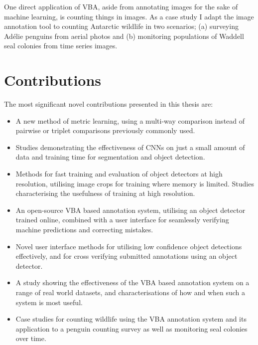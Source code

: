 One direct application of \gls{VBA}, aside from annotating images for the sake of machine learning, is counting things in images. As a case study I adapt the image annotation tool to counting Antarctic wildlife in two scenarios; (a) surveying Ad\'elie penguins from aerial photos and (b) monitoring populations of Waddell seal colonies from time series images.

\section {Contributions}
\label{sec: contributions}

The most significant novel contributions presented in this thesis are:

\begin{itemize}

    \item A new method of metric learning, using a multi-way comparison instead of pairwise or triplet comparisons previously commonly used.
    
    \item Studies demonstrating the effectiveness of \gls{CNN}s on just a small amount of data and training time for segmentation and object detection.
    
    \item Methods for fast training and evaluation of object detectors at high resolution, utilising image crops for training where memory is limited. Studies characterising the usefulness of training at high resolution.    
    
    \item An open-source \gls{VBA} based annotation system, utilising an object detector trained online, combined with a user interface for seamlessly verifying machine predictions and correcting mistakes.

    \item Novel user interface methods for utilising low confidence object detections effectively, and for cross verifying submitted annotations using an object detector.
    
    \item A study showing the effectiveness of the \gls{VBA} based annotation system on a range of real world datasets, and characterisations of how and when such a system is most useful.
    
    \item Case studies for counting wildlife using the \gls{VBA} annotation system and its application to a penguin counting survey as well as monitoring seal colonies over time. 
    
\end{itemize}

